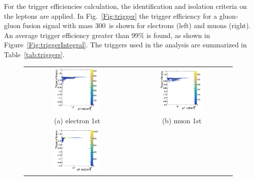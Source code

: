 \newline
For the trigger efficiencies calculation,  the identification  and isolation criteria on the leptons are applied.
In Fig.~\ref{Fig:trigger} the trigger efficiency for a gluon-gluon fusion signal with mass 300~\GeV is shown for electrons (left) and muons (right).
An average trigger efficiency greater than 99\% is found, as shown in Figure~\ref{Fig:triggerIntegral}. The triggers used in the analysis are summarized in Table~\ref{tab:triggers}. 
\begin{figure}[htbp]
\centering
\begin{tabular}{cc}
 \includegraphics[width=0.45\textwidth]{../AN/Figs/Trigger/ele1.png} &
 \includegraphics[width=0.45\textwidth]{../AN/Figs/Trigger/mu1.png} \\
 (a) electron 1st & (b) muon 1st \\
 \includegraphics[width=0.45\textwidth]{../AN/Figs/Trigger/ele2.png} &

\end{tabular}
\end{figure}
